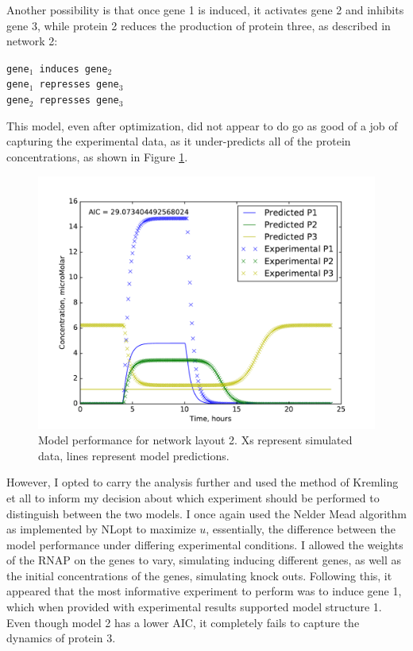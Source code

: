 \documentclass{article}
\begin{document}
Another possibility is that once gene 1 is induced, it activates gene 2 and inhibits gene 3, while protein 2 reduces the production of protein three, as described in network 2:\\

\begin{centering}
\texttt{gene$_1$ induces gene$_2$\\
gene$_1$ represses gene$_3$\\
gene$_2$ represses gene$_3$\\
}
\end{centering}
This model, even after optimization, did not appear to do go as good of a job of capturing the experimental data, as it under-predicts all of the protein concentrations, as shown in Figure \ref{fig:P3Layout3}.
\begin{figure}[!htb]
\includegraphics[width=12cm]{../Problem3/figures/postNMPlotLayout3}
\caption{Model performance for network layout 2. Xs represent simulated data, lines represent model predictions.}
\label{fig:P3Layout3}
\end{figure}

However, I opted to carry the analysis further and used the method of Kremling et all to inform my decision about which experiment should be performed to distinguish between the two models. I once again used the Nelder Mead algorithm as implemented by NLopt to maximize $u$, essentially, the difference between the model performance under differing experimental conditions. I allowed the weights of the RNAP on the genes to vary, simulating inducing different genes, as well as the initial concentrations of the genes, simulating knock outs. Following this, it appeared that the most informative experiment to perform was to induce gene 1, which when provided with experimental results supported model structure 1. Even though model 2 has a lower AIC, it completely fails to capture the dynamics of protein 3.
\end{document}
